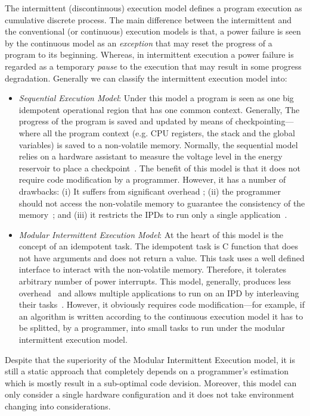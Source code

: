\documentclass[pageno]{jpaper}
\begin{document}
	The intermittent (discontinuous) execution model defines a program execution as cumulative discrete process. The main difference between the intermittent and the conventional (or continuous) execution models is that, a power failure is seen by the continuous model as an \emph{exception} that may reset the progress of a program to its beginning. Whereas, in intermittent execution a power failure is regarded as a temporary \emph{pause} to the execution that may result in some progress degradation. Generally we can classify the intermittent execution model into: 
	\begin{itemize}
		\item \emph{Sequential Execution Model}:
			Under this model a program is seen as one big idempotent operational region that has one common context. Generally, The progress of the program is saved and updated by means of checkpointing---where all the program context (e.g. CPU registers, the stack and the global variables) is saved to a non-volatile memory. Normally, the sequential model relies on a hardware assistant to measure the voltage level in the energy reservoir to place a checkpoint~\cite{mementos, harvOS, hibernus}. The benefit of this model is that it does not require code modification by a programmer. However, it has a number of drawbacks: (i) It suffers from significant overhead \cite{chain}; (ii) the programmer should not access the non-volatile memory to guarantee the consistency of the memory~\cite{xxxx}; and (iii) it restricts the IPDs to run only a single application~\cite{inos}. 
		\item \emph{Modular Intermittent Execution Model}:
			At the heart of this model is the concept of an idempotent task. The idempotent task is C function that does not have arguments and does not return a value. This task uses a well defined interface to interact with the non-volatile memory. Therefore, it tolerates arbitrary number of power interrupts. This model, generally, produces less overhead~\cite{chain} and allows multiple applications to run on an IPD by interleaving their tasks~\cite{inos}. However, it obviously requires code modification---for example, if an algorithm is written according to the continuous execution model it has to be splitted, by a programmer, into small tasks to run under the modular intermittent execution model.
	\end{itemize}

Despite that the superiority of the Modular Intermittent Execution model, it is still a static approach that completely depends on a programmer's estimation which is mostly result in a sub-optimal code devision. Moreover, this model can only consider a single hardware configuration and it does not take environment changing into considerations. 
\end{document}
